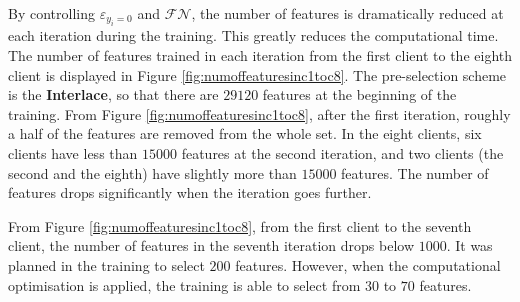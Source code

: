 By controlling $\varepsilon_{y_i=0}$ and $\mathcal{FN}$, the number of features is dramatically reduced at each iteration during the training. This greatly reduces the computational time. The number of features trained in each iteration from the first client to the eighth client is displayed in \mbox{Figure} \ref{fig:numoffeaturesinc1toc8}. The pre-selection scheme is the \textbf{Interlace}, so that there are $29120$ features at the beginning of the training. From \mbox{Figure} \ref{fig:numoffeaturesinc1toc8}, after the first iteration, roughly a half of the features are removed from the whole set. In the eight clients, six clients have less than $15000$ features at the second iteration, and two clients (the second and the eighth) have slightly more than $15000$ features. The number of features drops significantly when the iteration goes further.

From \mbox{Figure} \ref{fig:numoffeaturesinc1toc8}, from the first client to the seventh client, the number of features in the seventh iteration drops below $1000$. It was planned in the training to select $200$ features. However, when the computational optimisation is applied, the training is able to select from $30$ to $70$ features.

